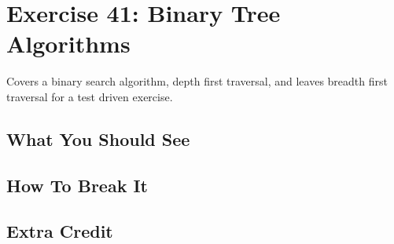 \chapter{Exercise 41: Binary Tree Algorithms}

Covers a binary search algorithm, depth first traversal, and leaves breadth first traversal for a test driven exercise.

\section{What You Should See}


\section{How To Break It}


\section{Extra Credit}



